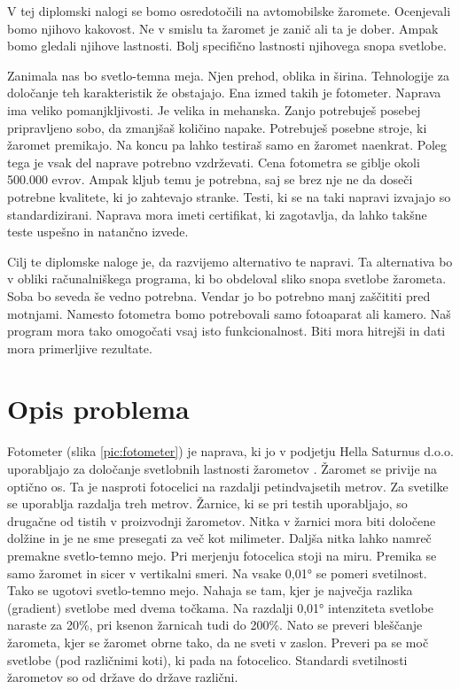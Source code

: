 \documentclass[oneside, a4paper, 12pt]{book}
\begin{document}
V tej diplomski nalogi se bomo osredotočili na avtomobilske žaromete. Ocenjevali bomo njihovo kakovost. Ne v smislu ta žaromet je zanič ali ta je dober. Ampak bomo gledali njihove lastnosti. Bolj specifično lastnosti njihovega snopa svetlobe.

Zanimala nas bo svetlo-temna meja. Njen prehod, oblika in širina. Tehnologije za določanje teh karakteristik že obstajajo. Ena izmed takih je fotometer. Naprava ima veliko pomanjkljivosti. Je velika in mehanska. Zanjo potrebuješ posebej pripravljeno sobo, da zmanjšaš količino napake. Potrebuješ posebne stroje, ki žaromet premikajo. Na koncu pa lahko testiraš samo en žaromet naenkrat. Poleg tega je vsak del naprave potrebno vzdrževati. Cena fotometra se giblje okoli 500.000 evrov. Ampak kljub temu je potrebna, saj se brez nje ne da doseči potrebne kvalitete, ki jo zahtevajo stranke. Testi, ki se na taki napravi izvajajo so standardizirani. Naprava mora imeti certifikat, ki zagotavlja, da lahko takšne teste uspešno in natančno izvede.

Cilj te diplomske naloge je, da razvijemo alternativo te napravi. Ta alternativa bo v obliki računalniškega programa, ki bo obdeloval sliko snopa svetlobe žarometa. Soba bo seveda še vedno potrebna. Vendar jo bo potrebno manj zaščititi pred motnjami. Namesto fotometra bomo potrebovali samo fotoaparat ali kamero. Naš program mora tako omogočati vsaj isto funkcionalnost. Biti mora hitrejši in dati mora primerljive rezultate.

\chapter{Opis problema}
Fotometer (slika \ref{pic:fotometer}) je naprava, ki jo v podjetju Hella Saturnus d.o.o. uporabljajo za določanje svetlobnih lastnosti žarometov \cite{hella-fotometer}. Žaromet se privije na optično os. Ta je nasproti fotocelici na razdalji petindvajsetih metrov. Za svetilke se uporablja razdalja treh metrov. Žarnice, ki se pri testih uporabljajo, so drugačne od tistih v proizvodnji žarometov. Nitka v žarnici mora biti določene dolžine in je ne sme presegati za več kot milimeter. Daljša nitka lahko namreč premakne svetlo-temno mejo. Pri merjenju fotocelica stoji na miru. Premika se samo žaromet in sicer v vertikalni smeri. Na vsake 0,01° se pomeri svetilnost. Tako se ugotovi svetlo-temno mejo. Nahaja se tam, kjer je največja razlika (gradient) svetlobe med dvema točkama. Na razdalji 0,01° intenziteta svetlobe naraste za 20\%, pri ksenon žarnicah tudi do 200\%. Nato se preveri bleščanje žarometa, kjer se žaromet obrne tako, da ne sveti v zaslon. Preveri pa se moč svetlobe (pod različnimi koti), ki pada na fotocelico. Standardi svetilnosti žarometov so od države do države različni. 
\end{document}
